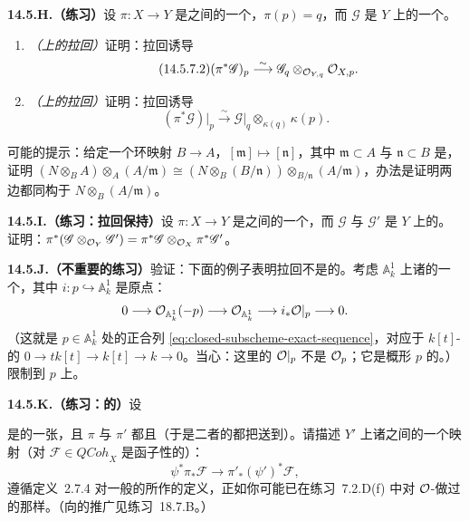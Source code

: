 \textbf{14.5.H.（练习）}\quad 设 $\pi\colon X\to Y$ 是\trScheme{}之间的一个\trMorphism，$\pi(p)=q$，而 $\mathscr{G}$ 是 $Y$ 上的一个\trQCSheaf。
\begin{enumerate}[label=(\alph*)]
\item \emph{（\trStalk{}上的拉回）}证明：拉回诱导\trIsomorphism
\begin{equation*}\tag{14.5.7.2}\label{eq:pullback-on-stalks}
(\pi^*\mathscr{G})_p\overset{\sim}{\longrightarrow}\mathscr{G}_q\otimes_{\mathcal{O}_{Y,q}}\mathcal{O}_{X,p}.
\end{equation*}
\item \emph{（\trFiber{}上的拉回）}证明：拉回诱导\trIsomorphism
\[
(\pi^*\mathscr{G})\vert_p\overset{\sim}{\longrightarrow}\mathscr{G}\vert_q\otimes_{\kappa(q)}\kappa(p).
\]
\end{enumerate}
可能的提示：给定一个环映射 $B\to A$，$[\mathfrak{m}]\mapsto[\mathfrak{n}]$，其中 $\mathfrak{m}\subset A$ 与 $\mathfrak{n}\subset B$ 是\trMaximalIdeal，证明 $(N\otimes_B A)\otimes_A(A/\mathfrak{m})\cong(N\otimes_B(B/\mathfrak{n}))\otimes_{B/\mathfrak{n}}(A/\mathfrak{m})$，办法是证明两边都同构于 $N\otimes_B(A/\mathfrak{m})$。

\textbf{14.5.I.（练习：拉回保持\trTensorProduct）}\quad 设 $\pi\colon X\to Y$ 是\trScheme{}之间的一个\trMorphism，而 $\mathscr{G}$ 与 $\mathscr{G}'$ 是 $Y$ 上的\trQCSheaf。证明：$\pi^*(\mathscr{G}\otimes_{\mathcal{O}_Y}\mathscr{G}')=\pi^*\mathscr{G}\otimes_{\mathcal{O}_X}\pi^*\mathscr{G}'$。

\textbf{14.5.J.（不重要的练习）}\quad 验证：下面的例子表明拉回不是\trLeftExact{}的。考虑 $\mathbb{A}^1_k$ 上诸\trSheaf{}的一个\trExactSequence，其中 $i\colon p\hookrightarrow\mathbb{A}^1_k$ 是原点：
\[
0\longrightarrow\mathcal{O}_{\mathbb{A}^1_k}(-p)\longrightarrow\mathcal{O}_{\mathbb{A}^1_k}\longrightarrow i_*\mathcal{O}\vert_p\longrightarrow 0.
\]
（这就是 $p\in\mathbb{A}^1_k$ 处的\trClosedSubscheme{}正合列 \eqref{eq:closed-subscheme-exact-sequence}，对应于 $k[t]$-\trModule{}的\trExactSequence{} $0\to tk[t]\to k[t]\to k\to 0$。当心：这里的 $\mathcal{O}\vert_p$ 不是\trStalk{} $\mathcal{O}_p$；它是概形 $p$ 的\trStructureSheaf。）限制到 $p$ 上。

\textbf{14.5.K.（练习：\trQCSheaf{}的\trPushPullMap）}\quad 设
\begin{center}
\end{center}
是\trScheme{}的一张\trCommutativeDiagram，且 $\pi$ 与 $\pi'$ 都\trQuasicompact{}且\trQuasiSeparated（于是二者的\trPushforward{}都把\trQCSheaf{}送到\trQCSheaf）。请描述 $Y'$ 上诸\trQCSheaf{}之间的一个\trNatural{}映射（对 $\mathscr{F}\in\mathit{QCoh}_X$ 是函子性的）：
\[
\psi^*\pi_*\mathscr{F}\longrightarrow\pi'_*(\psi')^*\mathscr{F},
\]
遵循定义~2.7.4 对一般\trSheaf{}的\trPushPullMap{}所作的定义，正如你可能已在\mbox{练习~7.2.D}(f) 中对 $\mathcal{O}$-\trModule{}做过的那样。（向\trCohomology{}的推广见\mbox{练习~18.7.B}。）

